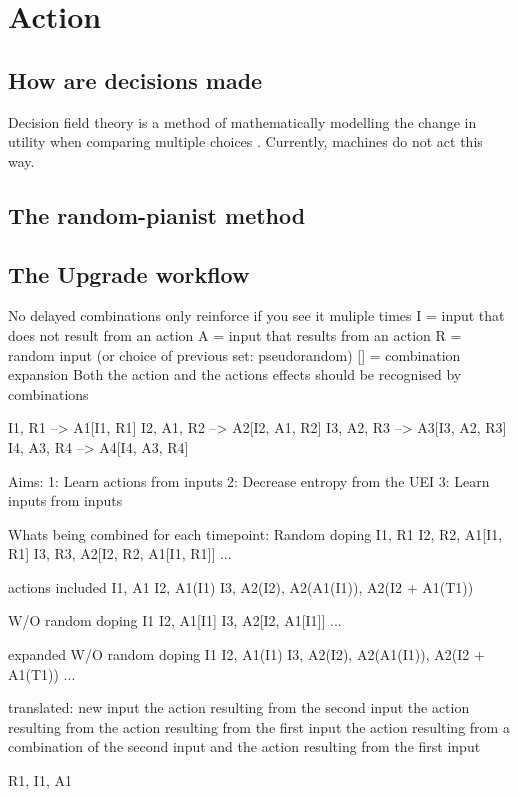 \chapter{Action}
\section{How are decisions made}
Decision field theory is a method of mathematically modelling the change in utility when comparing multiple choices \cite{busemeyer2002survey}.
Currently, machines do not act this way.

\section{The random-pianist method}

\section{The Upgrade workflow}
No delayed combinations
only reinforce if you see it muliple times
I = input that does not result from an action
A = input that results from an action
R = random input (or choice of previous set: pseudorandom)
[] = combination expansion
Both the action and the actions effects should be recognised by combinations

I1, R1        -->    A1[I1, R1]
I2, A1, R2    -->    A2[I2, A1, R2]
I3, A2, R3    -->    A3[I3, A2, R3]
I4, A3, R4    -->    A4[I4, A3, R4]

Aims:
1: Learn actions from inputs
2: Decrease entropy from the UEI
3: Learn inputs from inputs

Whats being combined for each timepoint:
Random doping
I1, R1
I2, R2, A1[I1, R1]
I3, R3, A2[I2, R2, A1[I1, R1]]
...

actions included
I1, A1
I2, A1(I1)
I3, A2(I2), A2(A1(I1)), A2(I2 + A1(T1))

W/O random doping
I1
I2, A1[I1]
I3, A2[I2, A1[I1]]
...

expanded W/O random doping
I1
I2, A1(I1)
I3, A2(I2), A2(A1(I1)), A2(I2 + A1(T1))
...

translated:
new input
the action resulting from the second input
the action resulting from the action resulting from the first input
the action resulting from a combination of the second input and the action resulting from the first input 

R1, I1, A1
